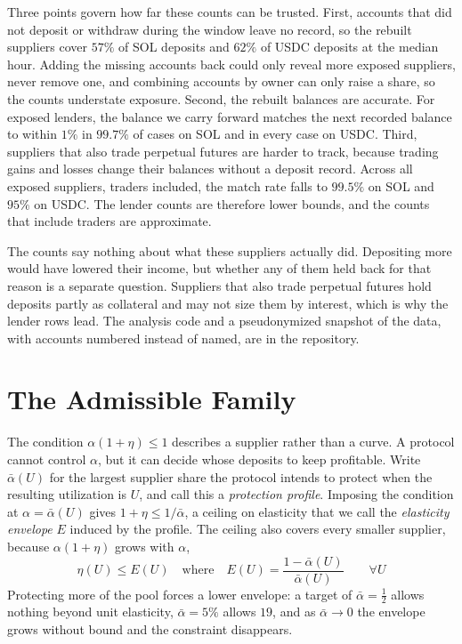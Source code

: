 \documentclass[11pt,a4paper]{article}
\begin{document}
Three points govern how far these counts can be trusted. First, accounts that did not deposit or withdraw during the window leave no record, so the rebuilt suppliers cover $57\%$ of SOL deposits and $62\%$ of USDC deposits at the median hour. Adding the missing accounts back could only reveal more exposed suppliers, never remove one, and combining accounts by owner can only raise a share, so the counts understate exposure. Second, the rebuilt balances are accurate. For exposed lenders, the balance we carry forward matches the next recorded balance to within $1\%$ in $99.7\%$ of cases on SOL and in every case on USDC. Third, suppliers that also trade perpetual futures are harder to track, because trading gains and losses change their balances without a deposit record. Across all exposed suppliers, traders included, the match rate falls to $99.5\%$ on SOL and $95\%$ on USDC. The lender counts are therefore lower bounds, and the counts that include traders are approximate.

The counts say nothing about what these suppliers actually did. Depositing more would have lowered their income, but whether any of them held back for that reason is a separate question. Suppliers that also trade perpetual futures hold deposits partly as collateral and may not size them by interest, which is why the lender rows lead. The analysis code and a pseudonymized snapshot of the data, with accounts numbered instead of named, are in the repository.

\section{The Admissible Family}
\label{sec:family}

The condition $\alpha(1+\eta)\leq1$ describes a supplier rather than a curve. A protocol cannot control $\alpha$, but it can decide whose deposits to keep profitable. Write $\bar\alpha(U)$ for the largest supplier share the protocol intends to protect when the resulting utilization is $U$, and call this a \emph{protection profile}. Imposing the condition at $\alpha=\bar\alpha(U)$ gives $1+\eta\leq1/\bar\alpha$, a ceiling on elasticity that we call the \emph{elasticity envelope} $E$ induced by the profile. The ceiling also covers every smaller supplier, because $\alpha(1+\eta)$ grows with $\alpha$,
\begin{equation}
\boxed{
\eta(U)\leq E(U)
\quad\text{where}\quad
E(U)=\frac{1-\bar\alpha(U)}{\bar\alpha(U)}
\qquad\forall U
}
\label{eq:envelope}
\end{equation}
Protecting more of the pool forces a lower envelope: a target of $\bar\alpha=\tfrac12$ allows nothing beyond unit elasticity, $\bar\alpha=5\%$ allows $19$, and as $\bar\alpha\to0$ the envelope grows without bound and the constraint disappears.
\end{document}
